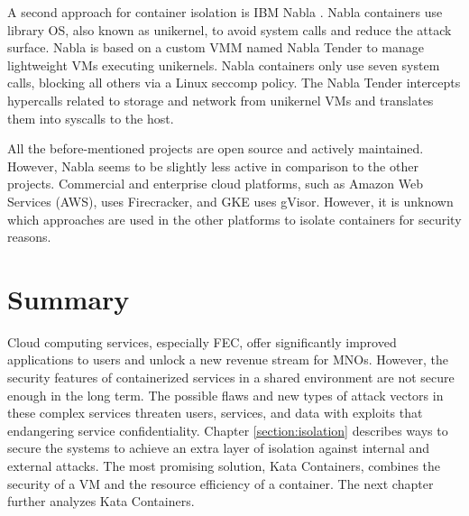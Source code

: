 A second approach for container isolation is IBM Nabla \cite{Nabla}. Nabla containers use library OS, also known as unikernel, to avoid system calls and reduce the attack surface. Nabla is based on a custom VMM named Nabla Tender to manage lightweight VMs executing unikernels. Nabla containers only use seven system calls, blocking all others via a Linux seccomp policy. The Nabla Tender intercepts hypercalls related to storage and network from unikernel VMs and translates them into syscalls to the host. \cite{Debab2021}

All the before-mentioned projects are open source and actively maintained. However, Nabla seems to be slightly less active in comparison to the other projects. Commercial and enterprise cloud platforms, such as Amazon Web Services (AWS), uses Firecracker, and GKE uses gVisor. However, it is unknown which approaches are used in the other platforms to isolate containers for security reasons.

\section{Summary}

Cloud computing services, especially FEC, offer significantly improved applications to users and unlock a new revenue stream for MNOs. However, the security features of containerized services in a shared environment are not secure enough in the long term. The possible flaws and new types of attack vectors in these complex services threaten users, services, and data with exploits that endangering service confidentiality. Chapter \ref{section:isolation} describes ways to secure the systems to achieve an extra layer of isolation against internal and external attacks. The most promising solution, Kata Containers, combines the security of a VM and the resource efficiency of a container. The next chapter further analyzes Kata Containers.